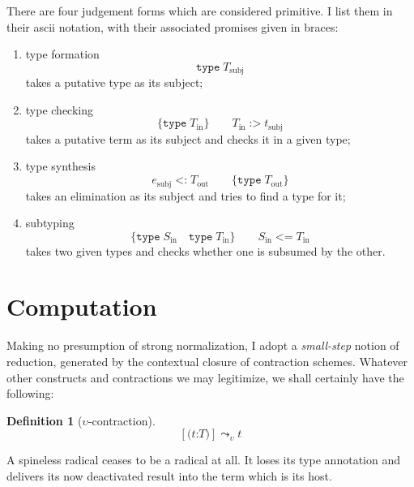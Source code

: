\documentclass{jfp1}
\newtheorem{definition}[theorem]{Definition}
\newcommand{\Pa}[1]{\texttt{(}#1\texttt{)}}
\newcommand{\hb}{\texttt{:}}
\newcommand{\ra}[2]{\Pa{#1 \hb #2}}
\begin{document}
\newcommand{\type}[1]{\texttt{type}\;#1}
\newcommand{\chek}[2]{#1\;\texttt{:>}\;#2}
\newcommand{\synth}[2]{#1\;\texttt{<:}\;#2}
\newcommand{\subty}[2]{#1\;\texttt{<=}\;#2}
\newcommand{\redu}[2]{#1\;\texttt{\raisebox{0.035in}{\texttildelow}>}\;#2}

There are four judgement forms which are considered primitive. I list them in their ascii notation, with their associated
promises given in braces:
\begin{enumerate}
\item type formation
\[\type{T_{\mbox{subj}}}
\]
takes a putative type as its subject;
\item type checking
\[\{\type{T_{\mbox{in}}\}}\qquad
\chek{T_{\mbox{in}}}{t_{\mbox{subj}}}
\]
takes a putative term as its subject and checks it in a given type;
\item type synthesis
\[\synth{e_{\mbox{subj}}}{T_{\mbox{out}}}\qquad
\{\type{T_{\mbox{out}}}\}
\]
takes an elimination as its subject and tries to find a type for it;
\item subtyping
\[\{\type{S_{\mbox{in}}}\quad \type{T_{\mbox{in}}}\}\qquad
\subty{S_{\mbox{in}}}{T_{\mbox{in}}}
\]
takes two given types and checks whether one is subsumed by the other.
\end{enumerate}


\section{Computation}

Making no presumption of strong normalization, I adopt a \emph{small-step} notion of reduction, generated by the contextual closure of contraction schemes. Whatever other constructs and contractions we may legitimize, we shall certainly have the following:

\begin{definition}[$\upsilon$-contraction]
\[[\ra tT] \leadsto_\upsilon t\]
\end{definition}

A spineless radical ceases to be a radical at all. It loses its type annotation and delivers its now deactivated result into the term which is its host.





\end{document}
